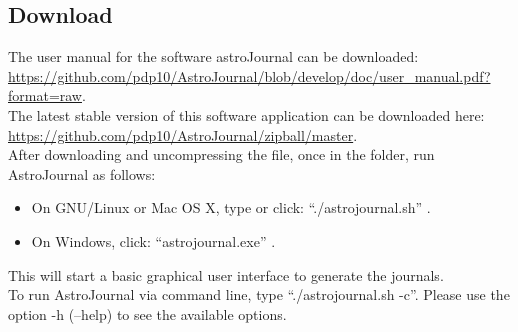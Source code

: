 \subsection{Download}
\label{subsec:Download}
The user manual for the software astroJournal can be downloaded:\\ \href{https://github.com/pdp10/AstroJournal/blob/develop/doc/user\_manual.pdf?format=raw}{https://github.com/pdp10/AstroJournal/blob/develop/doc/user\_manual.pdf?format=raw}.\\

The latest stable version of this software application can be downloaded here:\\
\href{https://github.com/pdp10/AstroJournal/zipball/master}{https://github.com/pdp10/AstroJournal/zipball/master}.\\

After downloading and uncompressing the file, once in the folder, run AstroJournal as follows:
\begin{itemize}
 \item On GNU/Linux or Mac OS X, type or click: ``./astrojournal.sh'' .
 \item On Windows, click: ``astrojournal.exe'' .
\end{itemize}
This will start a basic graphical user interface to generate the journals.\\
To run AstroJournal via command line, type ``./astrojournal.sh -c''. Please use the option -h (--help) to see the available options.
